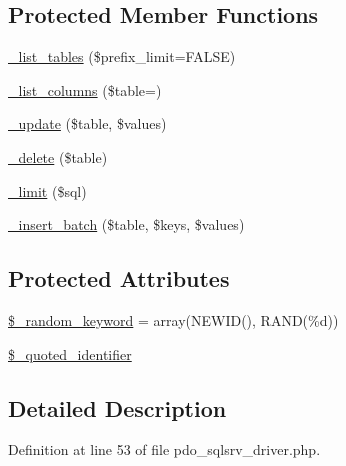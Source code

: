 \subsection*{Protected Member Functions}
\begin{DoxyCompactItemize}
\item 
\mbox{\hyperlink{class_c_i___d_b__pdo__sqlsrv__driver_a435c0f3ce54fe7daa178baa8532ebd54}{\+\_\+list\+\_\+tables}} (\$prefix\+\_\+limit=F\+A\+L\+SE)
\item 
\mbox{\hyperlink{class_c_i___d_b__pdo__sqlsrv__driver_a7ccb7f9c301fe7f0a9db701254142b63}{\+\_\+list\+\_\+columns}} (\$table=\textquotesingle{}\textquotesingle{})
\item 
\mbox{\hyperlink{class_c_i___d_b__pdo__sqlsrv__driver_a2540b03a93fa73ae74c10d0e16fc073e}{\+\_\+update}} (\$table, \$values)
\item 
\mbox{\hyperlink{class_c_i___d_b__pdo__sqlsrv__driver_a133ea8446ded52589bd22cc9163d0896}{\+\_\+delete}} (\$table)
\item 
\mbox{\hyperlink{class_c_i___d_b__pdo__sqlsrv__driver_a3a02ea06541b8ecc25a33a61651562c8}{\+\_\+limit}} (\$sql)
\item 
\mbox{\hyperlink{class_c_i___d_b__pdo__sqlsrv__driver_a1978e1358c812587a46e242630365099}{\+\_\+insert\+\_\+batch}} (\$table, \$keys, \$values)
\end{DoxyCompactItemize}
\subsection*{Protected Attributes}
\begin{DoxyCompactItemize}
\item 
\mbox{\hyperlink{class_c_i___d_b__pdo__sqlsrv__driver_a10213aa6e05f6d924d3277bb1d2fea00}{\$\+\_\+random\+\_\+keyword}} = array(\textquotesingle{}N\+E\+W\+ID()\textquotesingle{}, \textquotesingle{}R\+A\+ND(\%d)\textquotesingle{})
\item 
\mbox{\hyperlink{class_c_i___d_b__pdo__sqlsrv__driver_a1dae2f0e9ad7299438a9976d6cdbf2ad}{\$\+\_\+quoted\+\_\+identifier}}
\end{DoxyCompactItemize}


\subsection{Detailed Description}


Definition at line 53 of file pdo\+\_\+sqlsrv\+\_\+driver.\+php.



